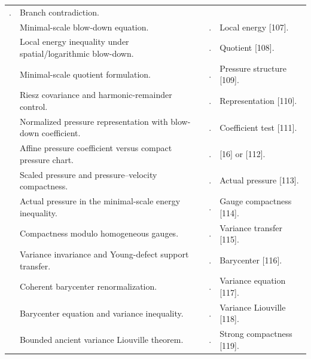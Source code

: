 \documentclass[11pt]{amsart}
\numberwithin{equation}{section}
\theoremstyle{plain}
\theoremstyle{definition}
\theoremstyle{remark}
\begin{document}
\begin{longtable}{@{}L{0.06\textwidth}L{0.25\textwidth}L{0.40\textwidth}L{0.21\textwidth}@{}}
. & Branch contradiction.\\
\relax
[106] & Minimal-scale blow-down equation. &
. & Local energy [107].\\
\relax
[107] & Local energy inequality under spatial/logarithmic blow-down. &
. & Quotient [108].\\
\relax
[108] & Minimal-scale quotient formulation. &
. & Pressure structure [109].\\
\relax
[109] & Riesz covariance and harmonic-remainder control. &
. & Representation [110].\\
\relax
[110] & Normalized pressure representation with blow-down coefficient. &
. & Coefficient test [111].\\
\relax
[111] & Affine pressure coefficient versus compact pressure chart. &
. & [16] or [112].\\
\relax
[112] & Scaled pressure and pressure--velocity compactness. &
. & Actual pressure [113].\\
\relax
[113] & Actual pressure in the minimal-scale energy inequality. &
. & Gauge compactness [114].\\
\relax
[114] & Compactness modulo homogeneous gauges. &
. & Variance transfer [115].\\
\relax
[115] & Variance invariance and Young-defect support transfer. &
. & Barycenter [116].\\
\relax
[116] & Coherent barycenter renormalization. &
. & Variance equation [117].\\
\relax
[117] & Barycenter equation and variance inequality. &
. & Variance Liouville [118].\\
\relax
[118] & Bounded ancient variance Liouville theorem. &
. & Strong compactness [119].\\

\end{longtable}
\end{document}
